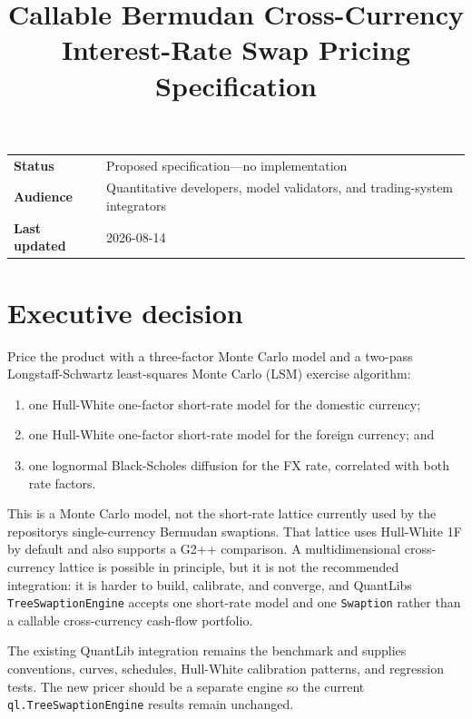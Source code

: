 \documentclass[conference]{IEEEtran}
\title{Callable Bermudan Cross-Currency Interest-Rate Swap Pricing
Specification}
\author{\TGIRArticleAuthorBlock}
\newcommand{\passthrough}[1]{#1}
\providecommand{\tightlist}{}
\begin{document}
\maketitle

{
\setcounter{tocdepth}{3}
}
\begin{center}
\begin{tabularx}{\columnwidth}{>{\bfseries}p{}X}
\toprule
Status & Proposed specification---no implementation \\
Audience & Quantitative developers, model validators, and trading-system integrators \\
Last updated & 2026-08-14 \\
\bottomrule
\end{tabularx}
\end{center}

\section{Executive decision}\label{1-executive-decision}

Price the product with a three-factor Monte Carlo model and a two-pass
Longstaff-Schwartz least-squares Monte Carlo (LSM) exercise algorithm:

\begin{enumerate}
\def\labelenumi{\arabic{enumi}.}
\tightlist
\item
  one Hull-White one-factor short-rate model for the domestic currency;
\item
  one Hull-White one-factor short-rate model for the foreign currency;
  and
\item
  one lognormal Black-Scholes diffusion for the FX rate, correlated with
  both rate factors.
\end{enumerate}

This is a Monte Carlo model, not the short-rate lattice currently used
by the repository\textquotesingle s single-currency Bermudan swaptions.
That lattice uses Hull-White 1F by default and also supports a G2++
comparison. A multidimensional cross-currency lattice is possible in
principle, but it is not the recommended integration: it is harder to
build, calibrate, and converge, and QuantLib\textquotesingle s
\passthrough{\lstinline!TreeSwaptionEngine!} accepts one short-rate
model and one \passthrough{\lstinline!Swaption!} rather than a callable
cross-currency cash-flow portfolio.

The existing QuantLib integration remains the benchmark and supplies
conventions, curves, schedules, Hull-White calibration patterns, and
regression tests. The new pricer should be a separate engine so the
current \passthrough{\lstinline!ql.TreeSwaptionEngine!} results remain
unchanged.
\end{document}
